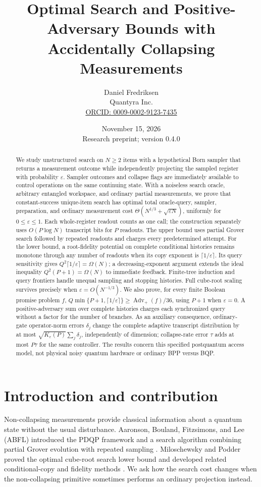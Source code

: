 \documentclass[11pt]{article}
\title{Optimal Search and Positive-Adversary Bounds with Accidentally Collapsing Measurements}
\author{Daniel Fredriksen\\Quantyra Inc.\\\small\href{https://orcid.org/0009-0002-9123-7435}{ORCID: 0009-0002-9123-7435}}
\date{November 15, 2026\\\small Research preprint; version 0.4.0}
\theoremstyle{remark}
\newcommand{\eps}{\varepsilon}
\begin{document}
\maketitle
\begin{abstract}
We study unstructured search on $N\ge2$ items with a hypothetical Born sampler that returns a
measurement outcome while independently projecting the sampled register with
probability $\eps$. Sampler outcomes and collapse flags are immediately
available to control operations on the same continuing state.
With a noiseless search oracle, arbitrary entangled workspace,
and ordinary partial measurements, we prove that constant-success unique-item
search has optimal total oracle-query, sampler, preparation, and ordinary
measurement cost
$\Theta(N^{1/3}+\sqrt{\eps N})$, uniformly for $0\le\eps\le1$.
Each whole-register readout counts as one call; the construction separately
uses $O(P\log N)$ transcript bits for $P$ readouts.
The upper bound uses partial Grover search followed by repeated readouts and
charges every predetermined attempt. For the lower bound, a root-fidelity
potential on complete conditional histories remains monotone through any
number of readouts when its copy exponent is $\lceil1/\eps\rceil$.
Its query sensitivity gives $Q^2\lceil1/\eps\rceil=\Omega(N)$;
a decreasing-exponent argument extends the ideal inequality
$Q^2(P+1)=\Omega(N)$ to immediate feedback. Finite-tree induction and query
frontiers handle unequal sampling and stopping histories.
Full cube-root scaling survives precisely when
$\eps=O(N^{-1/3})$. We also prove, for every finite Boolean promise problem $f$,
$Q\min\{P+1,\lceil1/\eps\rceil\}\ge\operatorname{Adv}_{+}(f)/36$,
using $P+1$ when $\eps=0$. A positive-adversary sum over complete histories
charges each synchronized query without a factor for the number of branches.
As an auxiliary consequence, ordinary-gate operator-norm errors
$\delta_j$ change the complete adaptive transcript distribution by at most
$\sqrt{K_\eps(P)}\sum_j\delta_j$, independently of dimension; collapse-rate
error $\tau$ adds at most $P\tau$ for the same controller.
The results concern this specified postquantum access model,
not physical noisy quantum hardware or ordinary BPP versus BQP.
\end{abstract}

\section{Introduction and contribution}
Non-collapsing measurements provide classical information about a quantum state
without the usual disturbance. Aaronson, Bouland, Fitzsimons, and Lee (ABFL)
introduced the PDQP framework and a search algorithm combining partial Grover
evolution with repeated sampling \cite{abfl}. Miloschewsky and Podder proved
the optimal cube-root search lower bound and developed related
conditional-copy and fidelity methods \cite{mp}. We ask how the search cost
changes when the non-collapsing primitive sometimes performs an ordinary
projection instead.
\end{document}
